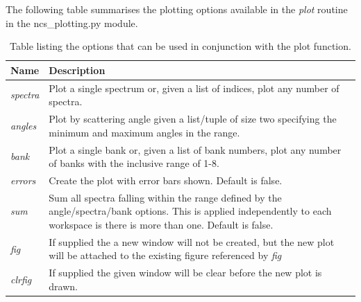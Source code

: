 \documentclass[paper=a4, fontsize=11pt]{scrartcl}	%
\numberwithin{equation}{section}															%
\numberwithin{figure}{section}																%
\numberwithin{table}{section}
\begin{document}
\begin{appendices}
The following table summarises the plotting options available in the \textit{plot} routine in the ncs\_plotting.py module.
\begin{table}[H]
\centering
\begin{tabular}{ l p{15cm}}
Name & Description \\ \hline
\textit{spectra} & Plot a single spectrum or, given a list of indices, plot any number of spectra. \\ \hline
\textit{angles} & Plot by scattering angle given a list/tuple of size two specifying the minimum and maximum angles in the range. \\ \hline
\textit{bank} & Plot a single bank or, given a list of bank numbers, plot any number of banks with the inclusive range of 1-8. \\ \hline
\textit{errors} & Create the plot with error bars shown. Default is false. \\ \hline
\textit{sum} & Sum all spectra falling within the range defined by the angle/spectra/bank options. This is applied independently to each workspace is there is more than one. Default is false.\\ \hline
\textit{fig} & If supplied the a new window will not be created, but the new plot will be attached to the existing figure referenced by \textit{fig}\\ \hline
\textit{clrfig} & If supplied the given window will be clear before the new plot is drawn. \\ \hline
\end{tabular}
\caption{Table listing the options that can be used in conjunction with the plot function.}
\label{table:plotting-parameters}
\end{table}

\end{appendices}


\end{document}
